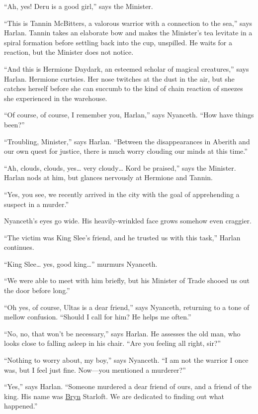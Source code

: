 \documentclass[smalldemyvopaper,11pt,twoside,onecolumn,openright,extrafontsizes]{memoir}
\begin{document}
``Ah, yes! Deru is a good girl,'' says the Minister.

``This is Tannin McBitters, a valorous warrior with a connection to the
sea,'' says Harlan. Tannin takes an elaborate bow and makes the
Minister's tea levitate in a spiral formation before settling back into
the cup, unspilled. He waits for a reaction, but the Minister does not
notice.

``And this is Hermione Daydark, an esteemed scholar of magical
creatures,'' says Harlan. Hermione curtsies. Her nose twitches at the
dust in the air, but she catches herself before she can succumb to the
kind of chain reaction of sneezes she experienced in the warehouse.

``Of course, of course, I remember you, Harlan,'' says Nyanceth. ``How
have things been?''

``Troubling, Minister,'' says Harlan. ``Between the disappearances in
Aberith and our own quest for justice, there is much worry clouding our
minds at this time.''

``Ah, clouds, clouds, yes\ldots{} very cloudy\ldots{} Kord be praised,''
says the Minister. Harlan nods at him, but glances nervously at Hermione
and Tannin.

``Yes, you see, we recently arrived in the city with the goal of
apprehending a suspect in a murder.''

Nyanceth's eyes go wide. His heavily-wrinkled face grows somehow even
craggier.

``The victim was King Slee's friend, and he trusted us with this task,''
Harlan continues.

``King Slee\ldots{} yes, good king\ldots{}'' murmurs Nyanceth.

``We were able to meet with him briefly, but his Minister of Trade
shooed us out the door before long.''

``Oh yes, of course, Ultas is a dear friend,'' says Nyanceth, returning
to a tone of mellow confusion. ``Should I call for him? He helps me
often.''

``No, no, that won't be necessary,'' says Harlan. He assesses the old
man, who looks close to falling asleep in his chair. ``Are you feeling
all right, sir?''

``Nothing to worry about, my boy,'' says Nyanceth. ``I am not the
warrior I once was, but I feel just fine. Now---you mentioned a
murderer?''

``Yes,'' says Harlan. ``Someone murdered a dear friend of ours, and a
friend of the king. His name was \href{/characters/bryn/}{Bryn}
Starloft. We are dedicated to finding out what happened.''
\end{document}
